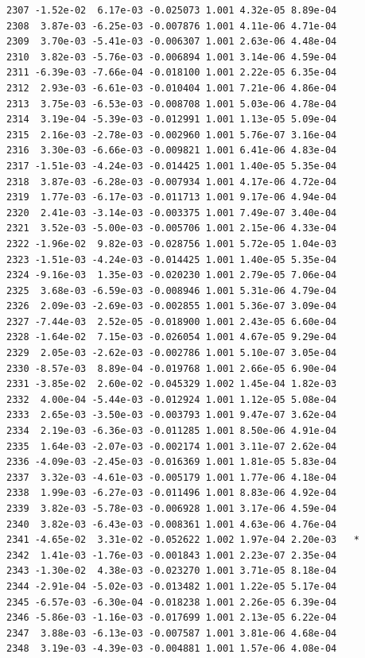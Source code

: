 \documentclass[
  letterpaper,
  DIV=11,
  numbers=noendperiod]{scrartcl}
\begin{document}
\begin{verbatim}
2307 -1.52e-02  6.17e-03 -0.025073 1.001 4.32e-05 8.89e-04    
2308  3.87e-03 -6.25e-03 -0.007876 1.001 4.11e-06 4.71e-04    
2309  3.70e-03 -5.41e-03 -0.006307 1.001 2.63e-06 4.48e-04    
2310  3.82e-03 -5.76e-03 -0.006894 1.001 3.14e-06 4.59e-04    
2311 -6.39e-03 -7.66e-04 -0.018100 1.001 2.22e-05 6.35e-04    
2312  2.93e-03 -6.61e-03 -0.010404 1.001 7.21e-06 4.86e-04    
2313  3.75e-03 -6.53e-03 -0.008708 1.001 5.03e-06 4.78e-04    
2314  3.19e-04 -5.39e-03 -0.012991 1.001 1.13e-05 5.09e-04    
2315  2.16e-03 -2.78e-03 -0.002960 1.001 5.76e-07 3.16e-04    
2316  3.30e-03 -6.66e-03 -0.009821 1.001 6.41e-06 4.83e-04    
2317 -1.51e-03 -4.24e-03 -0.014425 1.001 1.40e-05 5.35e-04    
2318  3.87e-03 -6.28e-03 -0.007934 1.001 4.17e-06 4.72e-04    
2319  1.77e-03 -6.17e-03 -0.011713 1.001 9.17e-06 4.94e-04    
2320  2.41e-03 -3.14e-03 -0.003375 1.001 7.49e-07 3.40e-04    
2321  3.52e-03 -5.00e-03 -0.005706 1.001 2.15e-06 4.33e-04    
2322 -1.96e-02  9.82e-03 -0.028756 1.001 5.72e-05 1.04e-03    
2323 -1.51e-03 -4.24e-03 -0.014425 1.001 1.40e-05 5.35e-04    
2324 -9.16e-03  1.35e-03 -0.020230 1.001 2.79e-05 7.06e-04    
2325  3.68e-03 -6.59e-03 -0.008946 1.001 5.31e-06 4.79e-04    
2326  2.09e-03 -2.69e-03 -0.002855 1.001 5.36e-07 3.09e-04    
2327 -7.44e-03  2.52e-05 -0.018900 1.001 2.43e-05 6.60e-04    
2328 -1.64e-02  7.15e-03 -0.026054 1.001 4.67e-05 9.29e-04    
2329  2.05e-03 -2.62e-03 -0.002786 1.001 5.10e-07 3.05e-04    
2330 -8.57e-03  8.89e-04 -0.019768 1.001 2.66e-05 6.90e-04    
2331 -3.85e-02  2.60e-02 -0.045329 1.002 1.45e-04 1.82e-03    
2332  4.00e-04 -5.44e-03 -0.012924 1.001 1.12e-05 5.08e-04    
2333  2.65e-03 -3.50e-03 -0.003793 1.001 9.47e-07 3.62e-04    
2334  2.19e-03 -6.36e-03 -0.011285 1.001 8.50e-06 4.91e-04    
2335  1.64e-03 -2.07e-03 -0.002174 1.001 3.11e-07 2.62e-04    
2336 -4.09e-03 -2.45e-03 -0.016369 1.001 1.81e-05 5.83e-04    
2337  3.32e-03 -4.61e-03 -0.005179 1.001 1.77e-06 4.18e-04    
2338  1.99e-03 -6.27e-03 -0.011496 1.001 8.83e-06 4.92e-04    
2339  3.82e-03 -5.78e-03 -0.006928 1.001 3.17e-06 4.59e-04    
2340  3.82e-03 -6.43e-03 -0.008361 1.001 4.63e-06 4.76e-04    
2341 -4.65e-02  3.31e-02 -0.052622 1.002 1.97e-04 2.20e-03   *
2342  1.41e-03 -1.76e-03 -0.001843 1.001 2.23e-07 2.35e-04    
2343 -1.30e-02  4.38e-03 -0.023270 1.001 3.71e-05 8.18e-04    
2344 -2.91e-04 -5.02e-03 -0.013482 1.001 1.22e-05 5.17e-04    
2345 -6.57e-03 -6.30e-04 -0.018238 1.001 2.26e-05 6.39e-04    
2346 -5.86e-03 -1.16e-03 -0.017699 1.001 2.13e-05 6.22e-04    
2347  3.88e-03 -6.13e-03 -0.007587 1.001 3.81e-06 4.68e-04    
2348  3.19e-03 -4.39e-03 -0.004881 1.001 1.57e-06 4.08e-04    

\end{verbatim}
\end{document}
